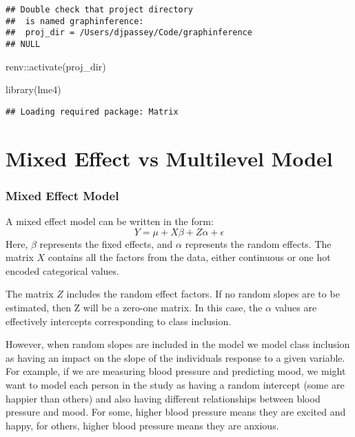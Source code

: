 \documentclass[
]{article}
\newenvironment{Shaded}{\begin{snugshade}}{\end{snugshade}}
\newcommand{\FunctionTok}[1]{\textcolor[rgb]{0.00,0.00,0.00}{#1}}
\newcommand{\NormalTok}[1]{#1}
\newcommand{\SpecialCharTok}[1]{\textcolor[rgb]{0.00,0.00,0.00}{#1}}
\begin{document}
\begin{verbatim}
## Double check that project directory
##  is named graphinference:
##  proj_dir = /Users/djpassey/Code/graphinference 
## NULL
\end{verbatim}

\begin{Shaded}
\begin{Highlighting}[]
\NormalTok{renv}\SpecialCharTok{::}\FunctionTok{activate}\NormalTok{(proj\_dir)}

\FunctionTok{library}\NormalTok{(lme4)}
\end{Highlighting}
\end{Shaded}

\begin{verbatim}
## Loading required package: Matrix
\end{verbatim}

\hypertarget{mixed-effect-vs-multilevel-model}{%
\section{Mixed Effect vs Multilevel
Model}\label{mixed-effect-vs-multilevel-model}}

\hypertarget{mixed-effect-model}{%
\subsubsection{Mixed Effect Model}\label{mixed-effect-model}}

A mixed effect model can be written in the form: \[
Y =\mu + X \beta + Z \alpha + \epsilon
\] Here, \(\beta\) represents the fixed effects, and \(\alpha\)
represents the random effects. The matrix \(X\) contains all the factors
from the data, either continuous or one hot encoded categorical values.

The matrix \(Z\) includes the random effect factors. If no random slopes
are to be estimated, then Z will be a zero-one matrix. In this case, the
\(\alpha\) values are effectively intercepts corresponding to class
inclusion.

However, when random slopes are included in the model we model class
inclusion as having an impact on the slope of the individuals response
to a given variable. For example, if we are measuring blood pressure and
predicting mood, we might want to model each person in the study as
having a random intercept (some are happier than others) and also having
different relationships between blood pressure and mood. For some,
higher blood pressure means they are excited and happy, for others,
higher blood pressure means they are anxious.
\end{document}
